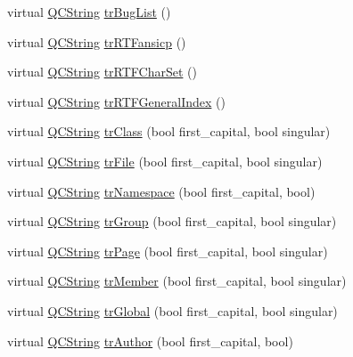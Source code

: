 \begin{DoxyCompactItemize}
\item 
virtual \mbox{\hyperlink{class_q_c_string}{Q\+C\+String}} \mbox{\hyperlink{class_translator_indonesian_ae9e345697076f105f1dc28b640824b54}{tr\+Bug\+List}} ()
\item 
virtual \mbox{\hyperlink{class_q_c_string}{Q\+C\+String}} \mbox{\hyperlink{class_translator_indonesian_a7fe8b62fd5171fc48bd92af2766a74ee}{tr\+R\+T\+Fansicp}} ()
\item 
virtual \mbox{\hyperlink{class_q_c_string}{Q\+C\+String}} \mbox{\hyperlink{class_translator_indonesian_a8a4a1a26894e827a68fcd9937a9a2ea9}{tr\+R\+T\+F\+Char\+Set}} ()
\item 
virtual \mbox{\hyperlink{class_q_c_string}{Q\+C\+String}} \mbox{\hyperlink{class_translator_indonesian_af16e6b3c8f9597ae61965c14f4562ab5}{tr\+R\+T\+F\+General\+Index}} ()
\item 
virtual \mbox{\hyperlink{class_q_c_string}{Q\+C\+String}} \mbox{\hyperlink{class_translator_indonesian_a8b7bf8809a07a9e83e95c9437f772946}{tr\+Class}} (bool first\+\_\+capital, bool singular)
\item 
virtual \mbox{\hyperlink{class_q_c_string}{Q\+C\+String}} \mbox{\hyperlink{class_translator_indonesian_ac01ac6ecd08ab3bfc276f02fec564c8c}{tr\+File}} (bool first\+\_\+capital, bool singular)
\item 
virtual \mbox{\hyperlink{class_q_c_string}{Q\+C\+String}} \mbox{\hyperlink{class_translator_indonesian_a60211c00aa2e822d2cd0164e1a1b356f}{tr\+Namespace}} (bool first\+\_\+capital, bool)
\item 
virtual \mbox{\hyperlink{class_q_c_string}{Q\+C\+String}} \mbox{\hyperlink{class_translator_indonesian_a5a68b19dd94ff7338fdf36eeee7fecc6}{tr\+Group}} (bool first\+\_\+capital, bool singular)
\item 
virtual \mbox{\hyperlink{class_q_c_string}{Q\+C\+String}} \mbox{\hyperlink{class_translator_indonesian_a2c851db6ed6b27e0ca60eeac9b33d39d}{tr\+Page}} (bool first\+\_\+capital, bool singular)
\item 
virtual \mbox{\hyperlink{class_q_c_string}{Q\+C\+String}} \mbox{\hyperlink{class_translator_indonesian_a96bc220bf746c756e0656bdbbc247bce}{tr\+Member}} (bool first\+\_\+capital, bool singular)
\item 
virtual \mbox{\hyperlink{class_q_c_string}{Q\+C\+String}} \mbox{\hyperlink{class_translator_indonesian_ab4d7c8e6e27bc2470708ce83aace2856}{tr\+Global}} (bool first\+\_\+capital, bool singular)
\item 
virtual \mbox{\hyperlink{class_q_c_string}{Q\+C\+String}} \mbox{\hyperlink{class_translator_indonesian_ad5fb31ccc0813683f8c55812a64911c6}{tr\+Author}} (bool first\+\_\+capital, bool)

\end{DoxyCompactItemize}
